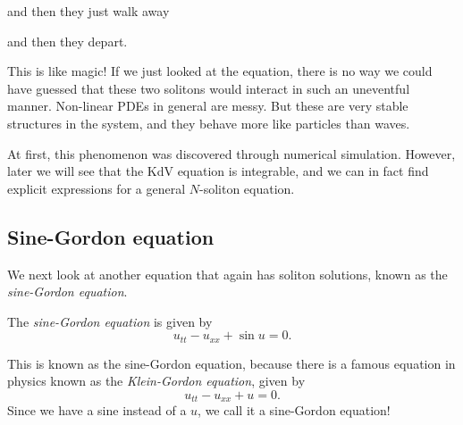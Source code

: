 \documentclass[a4paper]{article}
\begin{document}
\begin{center}
  \centering
\end{center}
and then they just walk away
\begin{center}
  \centering
\end{center}
and then they depart.
\begin{center}
  \centering
\end{center}
This is like magic! If we just looked at the equation, there is no way we could have guessed that these two solitons would interact in such an uneventful manner. Non-linear PDEs in general are messy. But these are very stable structures in the system, and they behave more like particles than waves.

At first, this phenomenon was discovered through numerical simulation. However, later we will see that the KdV equation is integrable, and we can in fact find explicit expressions for a general $N$-soliton equation.

\subsection{Sine-Gordon equation}
We next look at another equation that again has soliton solutions, known as the \emph{sine-Gordon equation}.
\begin{defi}
  The \emph{sine-Gordon equation} is given by
  \[
    u_{tt} - u_{xx} + \sin u = 0.
  \]
\end{defi}
This is known as the sine-Gordon equation, because there is a famous equation in physics known as the \emph{Klein-Gordon equation}, given by
\[
  u_{tt} - u_{xx} + u = 0.
\]
Since we have a sine instead of a $u$, we call it a sine-Gordon equation!
\end{document}
